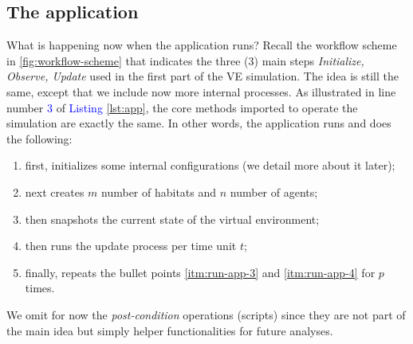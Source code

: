 \subsection{The application}
What is happening now when the application runs? Recall the workflow scheme in \autoref{fig:workflow-scheme} that indicates the three (3) main steps \textit{Initialize, Observe, Update} used in the first part of the VE simulation. The idea is still the same, except that we include now more internal processes. As illustrated in line number \textcolor{blue}{3} of \textcolor{blue}{Listing} \ref{lst:app}, the core methods imported to operate the simulation are exactly the same. In other words, the application runs and does the following:
\begin{enumerate}
    \item first, initializes some internal configurations (we detail more about it later);
    \item next creates $m$ number of habitats and $n$ number of agents;
    \item \label{itm:run-app-3} then snapshots the current state of the virtual environment;
    \item \label{itm:run-app-4} then runs the update process per time unit $t$;
    \item finally, repeats the bullet points \ref{itm:run-app-3} and \ref{itm:run-app-4} for $p$ times.
\end{enumerate}
We omit for now the \emph{post-condition} operations (scripts) since they are not part of the main idea but simply helper functionalities for future analyses.

